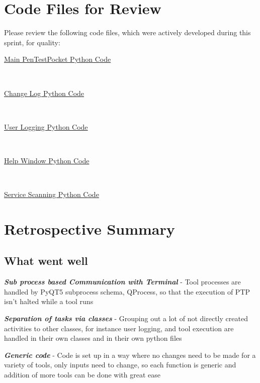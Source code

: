 \documentclass{article}
\begin{document}
\section{Code Files for Review}
Please review the following code files, which were actively developed during this
sprint, for quality:
\begin{center}
\href{https://github.com/zachA214/Adelson\_Senior\_Capstone/blob/main/PenTestPocket/pentestpocket.py}{Main PenTestPocket Python Code} 
\end{center}
\\
\begin{center}
\href{https://github.com/zachA214/Adelson_Senior_Capstone/blob/main/PenTestPocket/changelog.py}{Change Log Python Code}
\end{center}
\\
\begin{center}
\href{https://github.com/zachA214/Adelson_Senior_Capstone/blob/main/PenTestPocket/userlogging.py}{User Logging Python Code}   
\end{center}
\\
\begin{center}
\href{https://github.com/zachA214/Adelson_Senior_Capstone/blob/main/PenTestPocket/helpwindow.py}{Help Window Python Code}   
\end{center}
\\
\begin{center}
\href{https://github.com/zachA214/Adelson_Senior_Capstone/blob/main/PenTestPocket/servicescanning.py}{Service Scanning Python Code}   
\end{center}

\newpage
\section{Retrospective Summary}
\subsection{What went well}
\begin{center}
    \textbf{\textit{Sub process based Communication with Terminal}} - Tool processes are handled by PyQT5 subprocess schema, QProcess, so that the execution of PTP isn't halted while a tool runs
\end{center}
\begin{center}
    \textbf{\textit{Separation of tasks via classes}} - Grouping out a lot of not directly created activities to other classes, for instance user logging, and tool execution are handled in their own classes and in their own python files
\end{center}
\begin{center}
    \textbf{\textit{Generic code}} - Code is set up in a way where no changes need to be made for a variety of tools, only inputs need to change, so each function is generic and addition of more tools can be done with great ease
\end{center}
\end{document}
